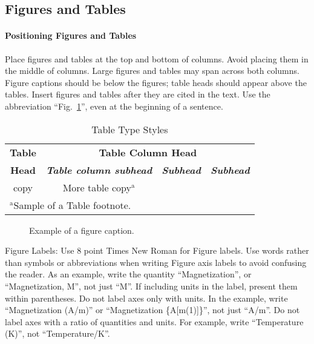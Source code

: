 \documentclass[conference]{IEEEtran}
\begin{document}
	
	\subsection{Figures and Tables}
	\paragraph{Positioning Figures and Tables} Place figures and tables at the top and 
	bottom of columns. Avoid placing them in the middle of columns. Large 
	figures and tables may span across both columns. Figure captions should be 
	below the figures; table heads should appear above the tables. Insert 
	figures and tables after they are cited in the text. Use the abbreviation 
	``Fig.~\ref{fig}'', even at the beginning of a sentence.
	
	\begin{table}[htbp]
		\caption{Table Type Styles}
		\begin{center}
			\begin{tabular}{|c|c|c|c|}
				\hline
				\textbf{Table}&\multicolumn{3}{|c|}{\textbf{Table Column Head}} \\
				\cline{2-4} 
				\textbf{Head} & \textbf{\textit{Table column subhead}}& \textbf{\textit{Subhead}}& \textbf{\textit{Subhead}} \\
				\hline
				copy& More table copy$^{\mathrm{a}}$& &  \\
				\hline
				\multicolumn{4}{l}{$^{\mathrm{a}}$Sample of a Table footnote.}
			\end{tabular}
			\label{tab1}
		\end{center}
	\end{table}
	
	\begin{figure}[htbp]
		\caption{Example of a figure caption.}
		\label{fig}
	\end{figure}
	
	Figure Labels: Use 8 point Times New Roman for Figure labels. Use words 
	rather than symbols or abbreviations when writing Figure axis labels to 
	avoid confusing the reader. As an example, write the quantity 
	``Magnetization'', or ``Magnetization, M'', not just ``M''. If including 
	units in the label, present them within parentheses. Do not label axes only 
	with units. In the example, write ``Magnetization (A/m)'' or ``Magnetization 
	\{A[m(1)]\}'', not just ``A/m''. Do not label axes with a ratio of 
	quantities and units. For example, write ``Temperature (K)'', not 
	``Temperature/K''.
	
\end{document}
